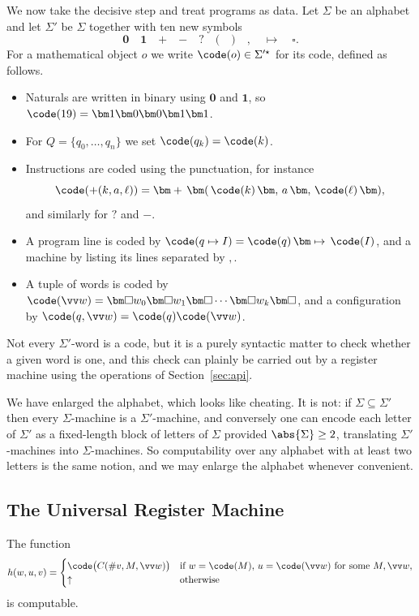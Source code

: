 We now take the decisive step and treat programs as data. Let $\Sigma$ be an alphabet and let $\Sigma'$ be $\Sigma$ together with ten new symbols
$$\bm{0} \quad \bm{1} \quad \bm{+} \quad \bm{-} \quad \bm{?} \quad \bm{(} \quad \bm{)} \quad \bm{,} \quad \bm{\mapsto} \quad \bm{\square}.$$
For a mathematical object $o$ we write $\code(o) \in \Sigma'^\star$ for its code, defined as follows.
\begin{itemize}
	\item Naturals are written in binary using $\bm 0$ and $\bm 1$, so $\code(19) = \bm1\bm0\bm0\bm1\bm1$.
	\item For $Q = \{q_0, \dots, q_n\}$ we set $\code(q_k) = \code(k)$.
	\item Instructions are coded using the punctuation, for instance
	$$\code(+(k,a,\ell)) = \bm+\,\bm(\,\code(k)\,\bm,\,a\,\bm,\,\code(\ell)\,\bm),$$
	and similarly for $?$ and $-$.
	\item A program line is coded by $\code(q\mapsto I) = \code(q)\,\bm\mapsto\,\code(I)$, and a machine by listing its lines separated by $\bm,$.
	\item A tuple of words is coded by $\code(\vv w) = \bm\square w_0 \bm\square w_1 \bm\square \cdots \bm\square w_k \bm\square$, and a configuration by $\code(q,\vv w) = \code(q)\code(\vv w)$.
\end{itemize}
Not every $\Sigma'$-word is a code, but it is a purely syntactic matter to check whether a given word is one, and this check can plainly be carried out by a register machine using the operations of Section~\ref{sec:api}.

\begin{remark}
	We have enlarged the alphabet, which looks like cheating. It is not: if $\Sigma \subseteq \Sigma'$ then every $\Sigma$-machine is a $\Sigma'$-machine, and conversely one can encode each letter of $\Sigma'$ as a fixed-length block of letters of $\Sigma$ provided $\abs{\Sigma}\geq 2$, translating $\Sigma'$-machines into $\Sigma$-machines. So computability over any alphabet with at least two letters is the same notion, and we may enlarge the alphabet whenever convenient.
\end{remark}

\subsection{The Universal Register Machine}

\begin{lemma}\label{lem:stepfunction}
	The function
	$$h(w,u,v) = \begin{cases} \code\big(C(\#v, M, \vv w)\big) & \text{if } w = \code(M),\, u = \code(\vv w) \text{ for some } M, \vv w, \\ \uparrow & \text{otherwise}\end{cases}$$
	is computable.
\end{lemma}

